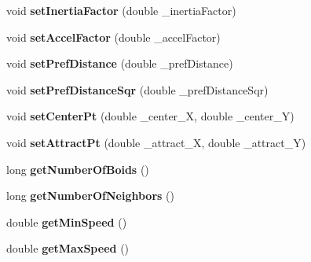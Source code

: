 \begin{DoxyCompactItemize}
\item 
\hypertarget{class_boids_manager_a25590bd280b7103bae70b1aefcce6da2}{void {\bfseries set\-Inertia\-Factor} (double \-\_\-inertia\-Factor)}\label{class_boids_manager_a25590bd280b7103bae70b1aefcce6da2}

\item 
\hypertarget{class_boids_manager_acd59f84076394ad9823aec0e4e646dbc}{void {\bfseries set\-Accel\-Factor} (double \-\_\-accel\-Factor)}\label{class_boids_manager_acd59f84076394ad9823aec0e4e646dbc}

\item 
\hypertarget{class_boids_manager_a4f030f4852f14f1729c10eaa9504f982}{void {\bfseries set\-Pref\-Distance} (double \-\_\-pref\-Distance)}\label{class_boids_manager_a4f030f4852f14f1729c10eaa9504f982}

\item 
\hypertarget{class_boids_manager_af1ca1c5fe3fff8f98be2436cc3c5c36d}{void {\bfseries set\-Pref\-Distance\-Sqr} (double \-\_\-pref\-Distance\-Sqr)}\label{class_boids_manager_af1ca1c5fe3fff8f98be2436cc3c5c36d}

\item 
\hypertarget{class_boids_manager_a30515cc8286393b9ec0279e2825dbffa}{void {\bfseries set\-Center\-Pt} (double \-\_\-center\-\_\-\-X, double \-\_\-center\-\_\-\-Y)}\label{class_boids_manager_a30515cc8286393b9ec0279e2825dbffa}

\item 
\hypertarget{class_boids_manager_a3e25cbf2865f2ffe4191328df668ccff}{void {\bfseries set\-Attract\-Pt} (double \-\_\-attract\-\_\-\-X, double \-\_\-attract\-\_\-\-Y)}\label{class_boids_manager_a3e25cbf2865f2ffe4191328df668ccff}

\item 
\hypertarget{class_boids_manager_ae6c04f90dffacd4c5b1128d4d42f0ca2}{long {\bfseries get\-Number\-Of\-Boids} ()}\label{class_boids_manager_ae6c04f90dffacd4c5b1128d4d42f0ca2}

\item 
\hypertarget{class_boids_manager_a9862e94e81da8efaeea71e52a4e3a528}{long {\bfseries get\-Number\-Of\-Neighbors} ()}\label{class_boids_manager_a9862e94e81da8efaeea71e52a4e3a528}

\item 
\hypertarget{class_boids_manager_a4027735d7ffdb4e9364df28337def09d}{double {\bfseries get\-Min\-Speed} ()}\label{class_boids_manager_a4027735d7ffdb4e9364df28337def09d}

\item 
\hypertarget{class_boids_manager_a0b06bcaf81f52248e9f638a9509c8bd5}{double {\bfseries get\-Max\-Speed} ()}\label{class_boids_manager_a0b06bcaf81f52248e9f638a9509c8bd5}


\end{DoxyCompactItemize}
